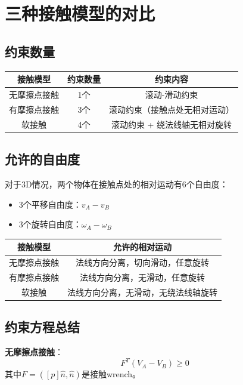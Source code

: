 \documentclass[12pt,a4paper]{article}
\begin{document}
\section{三种接触模型的对比}

\subsection{约束数量}

\begin{center}
\begin{tabular}{|c|c|c|}
\hline
\textbf{接触模型} & \textbf{约束数量} & \textbf{约束内容} \\
\hline
无摩擦点接触 & 1个 & 滚动-滑动约束 \\
\hline
有摩擦点接触 & 3个 & 滚动约束（接触点处无相对运动） \\
\hline
软接触 & 4个 & 滚动约束 + 绕法线轴无相对旋转 \\
\hline
\end{tabular}
\end{center}

\subsection{允许的自由度}

对于3D情况，两个物体在接触点处的相对运动有6个自由度：
\begin{itemize}
\item 3个平移自由度：$v_A - v_B$
\item 3个旋转自由度：$\omega_A - \omega_B$
\end{itemize}

\begin{center}
\begin{tabular}{|c|c|}
\hline
\textbf{接触模型} & \textbf{允许的相对运动} \\
\hline
无摩擦点接触 & 法线方向分离，切向滑动，任意旋转 \\
\hline
有摩擦点接触 & 法线方向分离，无滑动，任意旋转 \\
\hline
软接触 & 法线方向分离，无滑动，无绕法线轴旋转 \\
\hline
\end{tabular}
\end{center}

\subsection{约束方程总结}

\textbf{无摩擦点接触}：
\begin{equation}
F^T (V_A - V_B) \geq 0
\end{equation}
其中$F = ([p]\hat{n}, \hat{n})$是接触wrench。
\end{document}
